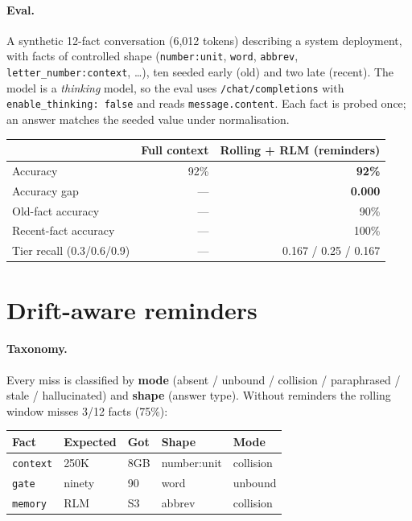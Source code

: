 \documentclass{article}
\begin{document}
\paragraph{Eval.} A synthetic 12-fact conversation (6{,}012 tokens) describing a
system deployment, with facts of controlled shape (\texttt{number:unit},
\texttt{word}, \texttt{abbrev}, \texttt{letter\_number:context}, \ldots), ten seeded
early (old) and two late (recent). The model is a \emph{thinking} model, so the eval
uses \texttt{/chat/completions} with \texttt{enable\_thinking: false} and reads
\texttt{message.content}. Each fact is probed once; an answer matches the seeded value
under normalisation.

\begin{center}
\begin{tabular}{@{}lrr@{}}
\toprule
 & Full context & Rolling + RLM (reminders) \\
\midrule
Accuracy & 92\% & \textbf{92\%} \\
Accuracy gap & --- & \textbf{0.000} \\
Old-fact accuracy & --- & 90\% \\
Recent-fact accuracy & --- & 100\% \\
Tier recall (0.3/0.6/0.9) & --- & 0.167 / 0.25 / 0.167 \\
\bottomrule
\end{tabular}
\end{center}

\section{Drift-aware reminders}
\label{sec:drift}

\paragraph{Taxonomy.} Every miss is classified by \textbf{mode} (absent / unbound /
collision / paraphrased / stale / hallucinated) and \textbf{shape} (answer type).
Without reminders the rolling window misses 3/12 facts (75\%):

\begin{center}
\begin{tabular}{@{}lllll@{}}
\toprule
Fact & Expected & Got & Shape & Mode \\
\midrule
\texttt{context} & 250K & 8GB & number:unit & collision \\
\texttt{gate}    & ninety & 90 & word & unbound \\
\texttt{memory}  & RLM & S3 & abbrev & collision \\
\bottomrule
\end{tabular}
\end{center}
\end{document}
